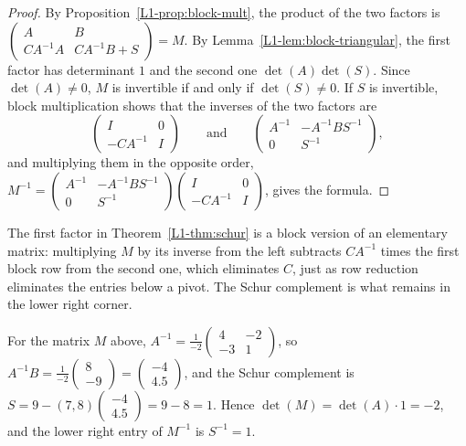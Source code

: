 \begin{proof}
    By Proposition~\ref{L1-prop:block-mult}, the product of the two factors is $\begin{pmatrix} A & B \\ CA^{-1}A & CA^{-1}B + S \end{pmatrix} = M$. By Lemma~\ref{L1-lem:block-triangular}, the first factor has determinant $1$ and the second one $\det(A)\det(S)$. Since $\det(A) \neq 0$, $M$ is invertible if and only if $\det(S) \neq 0$. If $S$ is invertible, block multiplication shows that the inverses of the two factors are
    \[\begin{pmatrix} I & 0 \\ -CA^{-1} & I \end{pmatrix} \qquad \text{and} \qquad \begin{pmatrix} A^{-1} & -A^{-1}BS^{-1} \\ 0 & S^{-1} \end{pmatrix},\]
    and multiplying them in the opposite order, $M^{-1} = \begin{pmatrix} A^{-1} & -A^{-1}BS^{-1} \\ 0 & S^{-1} \end{pmatrix}\begin{pmatrix} I & 0 \\ -CA^{-1} & I \end{pmatrix}$, gives the formula.
\end{proof}

The first factor in Theorem~\ref{L1-thm:schur} is a block version of an elementary matrix: multiplying $M$ by its inverse from the left subtracts $CA^{-1}$ times the first block row from the second one, which eliminates $C$, just as row reduction eliminates the entries below a pivot. The Schur complement is what remains in the lower right corner.

\begin{example}\label{L1-ex:schur}
    For the matrix $M$ above, $A^{-1} = \frac{1}{-2}\begin{pmatrix} 4 & -2 \\ -3 & 1 \end{pmatrix}$, so $A^{-1}B = \frac{1}{-2}\begin{pmatrix} 8 \\ -9 \end{pmatrix} = \begin{pmatrix} -4 \\ 4.5 \end{pmatrix}$, and the Schur complement is $S = 9 - (7, 8)\begin{pmatrix} -4 \\ 4.5 \end{pmatrix} = 9 - 8 = 1$. Hence $\det(M) = \det(A) \cdot 1 = -2$, and the lower right entry of $M^{-1}$ is $S^{-1} = 1$.
\end{example}

